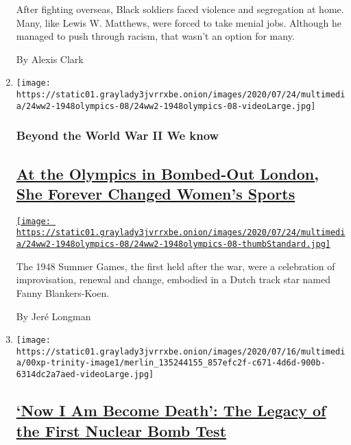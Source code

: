 \begin{enumerate}
  After fighting overseas, Black soldiers faced violence and segregation
  at home. Many, like Lewis W. Matthews, were forced to take menial
  jobs. Although he managed to push through racism, that wasn't an
  option for many.

  By Alexis Clark
\item
  \texttt{[image: https://static01.graylady3jvrrxbe.onion/images/2020/07/24/multimedia/24ww2-1948olympics-08/24ww2-1948olympics-08-videoLarge.jpg]}

  \hypertarget{beyond-the-world-war-ii-we-know-2}{%
  \subsubsection{Beyond the World War II We
  know}\label{beyond-the-world-war-ii-we-know-2}}

  \hypertarget{at-the-olympics-in-bombed-out-london-she-forever-changed-womens-sports}{%
  \subsection{\texorpdfstring{\href{/2020/07/24/magazine/1948-olympics-fanny-blankers-koen.html}{At
  the Olympics in Bombed-Out London, She Forever Changed Women's
  Sports}}{At the Olympics in Bombed-Out London, She Forever Changed Women's Sports}}\label{at-the-olympics-in-bombed-out-london-she-forever-changed-womens-sports}}

  \href{/2020/07/24/magazine/1948-olympics-fanny-blankers-koen.html}{\texttt{[image: https://static01.graylady3jvrrxbe.onion/images/2020/07/24/multimedia/24ww2-1948olympics-08/24ww2-1948olympics-08-thumbStandard.jpg]}}

  The 1948 Summer Games, the first held after the war, were a
  celebration of improvisation, renewal and change, embodied in a Dutch
  track star named Fanny Blankers-Koen.

  By Jeré Longman
\item
  \texttt{[image: https://static01.graylady3jvrrxbe.onion/images/2020/07/16/multimedia/00xp-trinity-image1/merlin\_135244155\_857efc2f-c671-4d6d-900b-6314dc2a7aed-videoLarge.jpg]}

  \hypertarget{now-i-am-become-death-the-legacy-of-the-first-nuclear-bomb-test}{%
  \subsection{\texorpdfstring{\href{/2020/07/15/us/trinity-test-anniversary.html}{`Now
  I Am Become Death': The Legacy of the First Nuclear Bomb
  Test}}{`Now I Am Become Death': The Legacy of the First Nuclear Bomb Test}}\label{now-i-am-become-death-the-legacy-of-the-first-nuclear-bomb-test}}


\end{enumerate}
